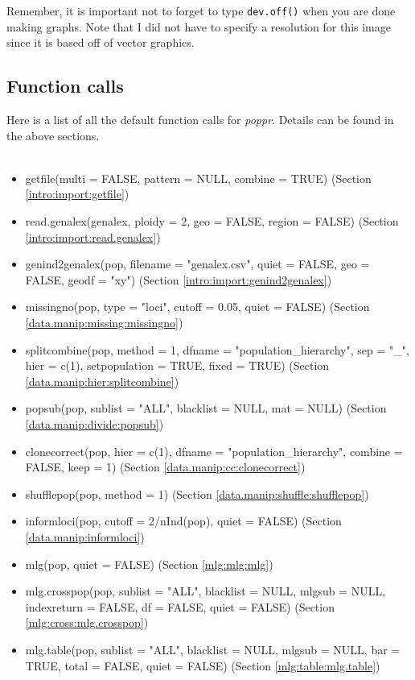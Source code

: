 \documentclass[letterpaper]{article}
\newcommand{\tab}{\hspace*{1em}}
\begin{document}
Remember, it is important not to forget to type \texttt{dev.off()} when you are done making graphs. Note that I did not have to specify a resolution for this image since it is based off of vector graphics.

\subsection{Function calls}\label{appendix:funk}

\tab\tab Here is a list of all the default function calls for \textit{poppr}. Details can be found in the above sections.\\
\tt \small
\begin{itemize}
\item getfile(multi = FALSE, pattern = NULL, combine = TRUE) (Section \ref{intro:import:getfile})
\item read.genalex(genalex, ploidy = 2, geo = FALSE, region = FALSE) (Section \ref{intro:import:read.genalex}) 
\item genind2genalex(pop, filename = "genalex.csv", quiet = FALSE, geo = FALSE, geodf = "xy") (Section \ref{intro:import:genind2genalex})
\item missingno(pop, type = "loci", cutoff = 0.05, quiet = FALSE) (Section \ref{data.manip:missing:missingno})
\item splitcombine(pop, method = 1, dfname = "population\_hierarchy", sep = "\_", hier = c(1), setpopulation = TRUE, fixed = TRUE) (Section \ref{data.manip:hier:splitcombine})
\item popsub(pop, sublist = "ALL", blacklist = NULL, mat = NULL) (Section \ref{data.manip:divide:popsub})
\item clonecorrect(pop, hier = c(1), dfname = "population\_hierarchy", combine = FALSE, keep = 1) (Section \ref{data.manip:cc:clonecorrect})
\item shufflepop(pop, method = 1) (Section \ref{data.manip:shuffle:shufflepop})
\item informloci(pop, cutoff = 2/nInd(pop), quiet = FALSE) (Section \ref{data.manip:informloci})
\item mlg(pop, quiet = FALSE) (Section \ref{mlg:mlg:mlg})
\item mlg.crosspop(pop, sublist = "ALL", blacklist = NULL, mlgsub = NULL, indexreturn = FALSE, df = FALSE, quiet = FALSE) (Section \ref{mlg:cross:mlg.crosspop})
\item mlg.table(pop, sublist = "ALL", blacklist = NULL, mlgsub = NULL, bar = TRUE, total = FALSE, quiet = FALSE) (Section \ref{mlg:table:mlg.table})

\end{itemize}
\end{document}
